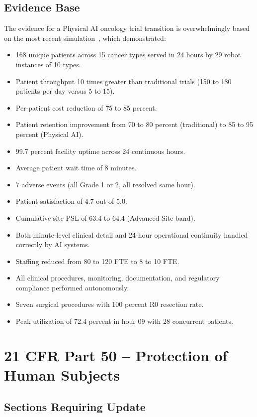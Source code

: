 \subsection{Evidence Base}

The evidence for a Physical AI oncology trial transition is overwhelmingly
based on the most recent simulation~\cite{newtrial2026}, which demonstrated:

\begin{itemize}
\item 168 unique patients across 15 cancer types served in 24 hours by 29
  robot instances of 10 types.
\item Patient throughput 10 times greater than traditional trials (150 to 180
  patients per day versus 5 to 15).
\item Per-patient cost reduction of 75 to 85 percent.
\item Patient retention improvement from 70 to 80 percent (traditional) to
  85 to 95 percent (Physical AI).
\item 99.7 percent facility uptime across 24 continuous hours.
\item Average patient wait time of 8 minutes.
\item 7 adverse events (all Grade 1 or 2, all resolved same hour).
\item Patient satisfaction of 4.7 out of 5.0.
\item Cumulative site PSL of 63.4 to 64.4 (Advanced Site band).
\item Both minute-level clinical detail and 24-hour operational continuity
  handled correctly by AI systems.
\item Staffing reduced from 80 to 120 FTE to 8 to 10 FTE.
\item All clinical procedures, monitoring, documentation, and regulatory
  compliance performed autonomously.
\item Seven surgical procedures with 100 percent R0 resection rate.
\item Peak utilization of 72.4 percent in hour 09 with 28 concurrent patients.
\end{itemize}

\section{21 CFR Part 50 -- Protection of Human Subjects}

\subsection{Sections Requiring Update}


